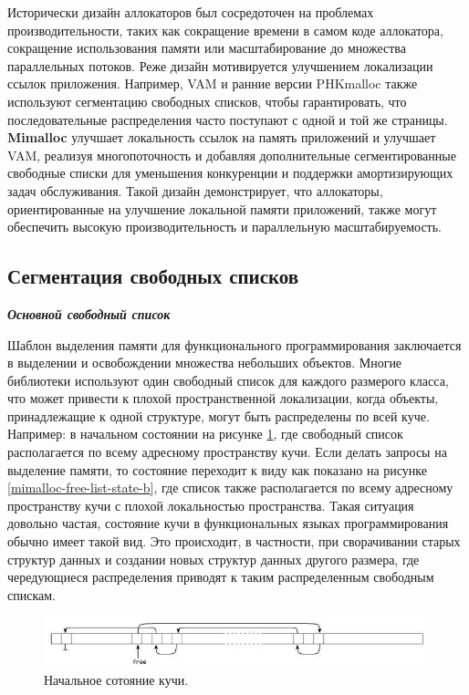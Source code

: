 Исторически дизайн аллокаторов был сосредоточен на проблемах производительности, таких как сокращение времени в самом коде аллокатора, сокращение использования памяти или масштабирование до множества параллельных потоков. Реже дизайн мотивируется улучшением локализации ссылок приложения. Например, VAM и ранние версии PHKmalloc также используют сегментацию свободных списков, чтобы гарантировать, что последовательные распределения часто поступают с одной и той же страницы. \textbf{Mimalloc} улучшает локальность ссылок на память приложений и улучшает VAM, реализуя многопоточность и добавляя дополнительные сегментированные свободные списки для уменьшения конкуренции и поддержки амортизирующих задач обслуживания. Такой дизайн демонстрирует, что аллокаторы, ориентированные на улучшение локальной памяти приложений, также могут обеспечить высокую производительность и параллельную масштабируемость.

\subsection{Сегментация свободных списков}
\textit{\textbf{Основной свободный список}}

Шаблон выделения памяти для функционального программирования заключается в выделении и освобождении множества небольших объектов. Многие библиотеки используют один свободный список для каждого размерого класса, что может привести к плохой пространственной локализации, когда объекты, принадлежащие к одной структуре, могут быть распределены по всей куче. Например: в начальном состоянии на рисунке \ref{mimalloc-free-list-state-a}, где свободный список располагается по всему адресному пространству кучи. Если делать запросы на выделение памяти, то состояние переходит к виду как показано на рисунке \ref{mimalloc-free-list-state-b}, где список также располагается по всему адресному пространству кучи с плохой локальностью пространства. Такая ситуация довольно частая, состояние кучи в функциональных языках программирования обычно имеет такой вид. Это происходит, в частности, при сворачивании старых структур данных и создании новых структур данных другого размера, где чередующиеся распределения приводят к таким распределенным свободным спискам.

\begin{figure}[!h]
	\begin{center}
		\includegraphics[scale=0.8]{images/mimalloc-free-list-state-a.jpg}
		\caption{Начальное сотояние кучи.}
		\label{mimalloc-free-list-state-a}
	\end{center}
\end{figure}

